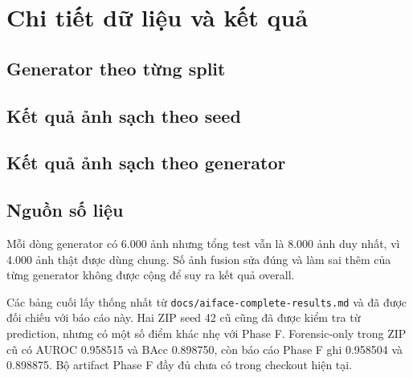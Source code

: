 \section{Chi tiết dữ liệu và kết quả}
\subsection{Generator theo từng split}
\begin{table}[H]
\centering
\caption{Các generator AI trong tập pilot.}
\label{tab:generator-mapping}

\end{table}

\subsection{Kết quả ảnh sạch theo seed}
\begin{table}[H]
\centering
\caption{Macro AUROC và BAcc theo seed trên cùng 8.000 ảnh test sạch.}
\label{tab:clean-seeds}

\end{table}

\subsection{Kết quả ảnh sạch theo generator}
\begin{table}[H]
\centering
\caption{AUROC và BAcc trung bình qua ba seed theo generator. Mean được tính từ số sáu chữ số trong báo cáo Phase F. Mỗi generator dùng chung 4.000 ảnh thật.}
\label{tab:per-generator}

\end{table}

\subsection{Nguồn số liệu}
Mỗi dòng generator có 6.000 ảnh nhưng tổng test vẫn là 8.000 ảnh duy nhất, vì 4.000 ảnh thật được dùng chung. Số ảnh fusion sửa đúng và làm sai thêm của từng generator không được cộng để suy ra kết quả overall.

Các bảng cuối lấy thống nhất từ \texttt{docs/aiface-complete-results.md} và đã được đối chiếu với báo cáo này. Hai ZIP seed 42 cũ cũng đã được kiểm tra từ prediction, nhưng có một số điểm khác nhẹ với Phase F. Forensic-only trong ZIP cũ có AUROC 0.958515 và BAcc 0.898750, còn báo cáo Phase F ghi 0.958504 và 0.898875. Bộ artifact Phase F đầy đủ chưa có trong checkout hiện tại.

